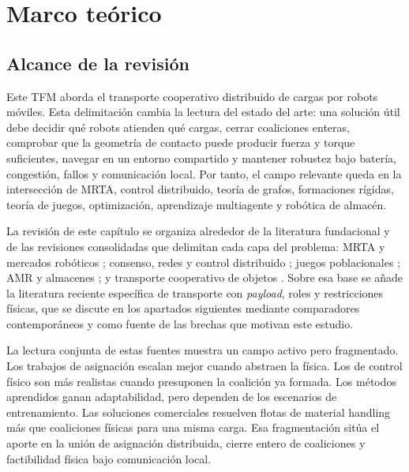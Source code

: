 \section{Marco teórico}
\label{sec:marco}

\subsection{Alcance de la revisión}

Este TFM aborda el transporte cooperativo distribuido de cargas por robots móviles.
Esta delimitación cambia la
lectura del estado del arte: una solución útil debe decidir qué robots atienden qué
cargas, cerrar coaliciones enteras, comprobar que la geometría de contacto puede
producir fuerza y torque suficientes, navegar en un entorno compartido y mantener
robustez bajo batería, congestión, fallos y comunicación local. Por tanto, el campo
relevante queda en la intersección de MRTA, control distribuido, teoría de grafos,
formaciones rígidas, teoría de juegos, optimización, aprendizaje multiagente y robótica
de almacén.

La revisión de este capítulo se organiza alrededor de la literatura fundacional y de las
revisiones consolidadas que delimitan cada capa del problema: MRTA y mercados robóticos
\citep{gerkey2004formal,dias2006market,korsah2013taxonomy}; consenso, redes y control
distribuido \citep{olfati2004consensus,olfati2007consensus,ren2008distributed,bullo2009distributed};
juegos poblacionales \citep{sandholm2010population,quijano2017population}; AMR y almacenes
\citep{leanh2006agv,wurman2008coordinating,azadeh2019warehouse}; y transporte cooperativo de
objetos \citep{tuci2018cooperative,farivarnejad2022multirobot,an2023cooperative}. Sobre esa
base se añade la literatura reciente específica de transporte con \emph{payload}, roles y
restricciones físicas, que se discute en los apartados siguientes mediante comparadores contemporáneos y
como fuente de las brechas que motivan este estudio.

La lectura conjunta de estas fuentes muestra un campo activo pero fragmentado. Los trabajos
de asignación escalan mejor cuando abstraen la física. Los de control físico son más
realistas cuando presuponen la coalición ya formada. Los métodos aprendidos ganan
adaptabilidad, pero dependen de los escenarios de entrenamiento. Las soluciones comerciales
resuelven flotas de material handling más que coaliciones físicas para una misma carga.
Esa fragmentación sitúa el aporte en la unión de asignación
distribuida, cierre entero de coaliciones y factibilidad física bajo comunicación local.

